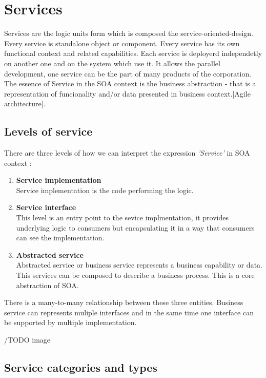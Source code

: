 \section{Services}
\label{sec:services}
Services are the logic units form which is composed the \gls{service-oriented-design}. Every service is standalone object or component. Every service has its own functional context and related capabilities. Each service is deployerd independetly on another one and on the system which use it. It allows the parallel development, one service can be the part of many products of the corporation.
The essence of Service in the SOA context is the business abstraction - that is a representation of funcionality and/or data presented in business context.[Agile architecture].

\subsection{Levels of service} 
\label{subsec:levels-of-serivce}

There are three levels of how we can interpret the expression \emph{'Service'} in SOA context \cite{agile-architecture}:
\begin{enumerate}
  \item \textbf{Service implementation} \hfill \\
Service implementation is the code performing the logic.
  \item \textbf{Service interface} \hfill \\ 
This level is an entry point to the sevice implmentation, it provides underlying logic to consumers but encapsulating it in a way that consumers can see the implementation. 
  \item \textbf{Abstracted service} \hfill \\
Abstracted service or business service represents a business capability or data. This services can be composed to describe a business process. This is a core abstraction of SOA.
\end{enumerate}

There is a many-to-many relationship between these three entities. Business service can represents muliple interfaces and in the same time one interface can be supported by multiple implementation.

/TODO image

\subsection{Service categories and types} %

